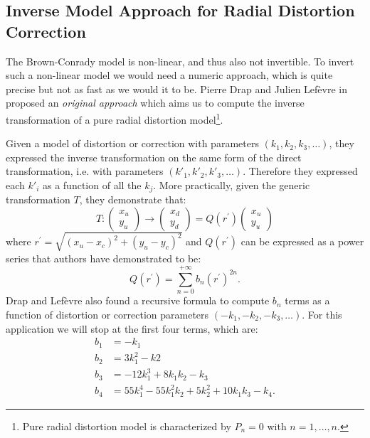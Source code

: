 \documentclass[12pt]{article}
\begin{document}
\subsection{Inverse Model Approach for Radial Distortion Correction}

The Brown-Conrady model is non-linear, and thus also not invertible. To invert such a non-linear model we would need a numeric approach, which is quite precise but not as fast as we would it to be. Pierre Drap and Julien Lefèvre in \cite{model} proposed an \textit{original approach} which aims us to compute the inverse transformation of a pure radial distortion model\footnote{ Pure radial distortion model is characterized by $P_n = 0$ with $n = 1,\dots,n$.}.

Given a model of distortion or correction with parameters $(k_1,k_2,k_3,\dots)$, they expressed the inverse transformation on the same form of the direct transformation, i.e. with parameters $(k'_1,k'_2,k'_3,\dots)$. Therefore they expressed each $k'_i$ as a function of all the $k_j$. More practically, given the generic transformation $T$, they demonstrate that:
%
\begin{equation}
  T:
  \begin{pmatrix}
    x_u \\
    y_u
  \end{pmatrix}
  \rightarrow
  \begin{pmatrix}
    x_d \\
    y_d
  \end{pmatrix}
  = Q(r^\prime)
  \begin{pmatrix}
    x_u \\
    y_u
  \end{pmatrix}
\end{equation}
%
where $r^\prime = \sqrt{(x_u-x_c)^2+(y_u-y_c)^2}$ and $Q(r^\prime)$ can be expressed as a power series that authors have demonstrated to be:
%
\begin{equation}
  Q(r^\prime)=\sum_{n=0}^{+\infty}b_n (r^\prime)^{2n}
  \label{Q}.
\end{equation}
%
Drap and Lefèvre also found a recursive formula to compute $b_n$ terms as a function of distortion or correction parameters $(-k_1,-k_2,-k_3,\dots)$. For this application we will stop at the first four terms, which are:
%
\begin{equation}
  \begin{split}
    b_1 &= - k_1 \\
    b_2 &= 3 k_1^2 - k2 \\
    b_3 &= - 12 k_1^3 + 8 k_1 k_2 - k_3 \\
    b_4 &= 55 k_1^4 - 55 k_1^2 k_2+ 5 k_2^2 + 10 k_1 k_3 - k_4.
  \end{split}
\end{equation}
\end{document}
